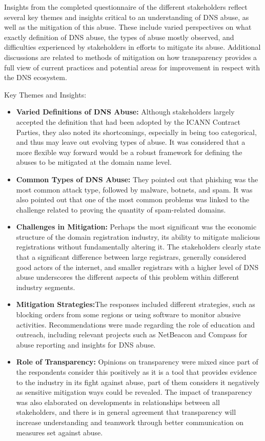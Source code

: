 Insights from the completed questionnaire of the different stakeholders reflect several key themes and insights critical to an understanding of DNS abuse, as well as the mitigation of this abuse. These include varied perspectives on what exactly definition of DNS abuse, the types of abuse mostly observed, and difficulties experienced by stakeholders in efforts to mitigate its abuse. Additional discussions are related to methods of mitigation on how transparency provides a full view of current practices and potential areas for improvement in respect with the DNS ecosystem.

Key Themes and Insights:

\begin{itemize}
  \item \textbf{Varied Definitions of DNS Abuse:} Although stakeholders largely accepted the definition that had been adopted by the ICANN Contract Parties, they also noted its shortcomings, especially in being too categorical, and thus may leave out evolving types of abuse. It was considered that a more flexible way forward would be a robust framework for defining the abuses to be mitigated at the domain name level.
  
  \item \textbf{Common Types of DNS Abuse:} They pointed out that phishing was the most common attack type, followed by malware, botnets, and spam. It was also pointed out that one of the most common problems was linked to the challenge related to proving the quantity of spam-related domains.
  
  \item \textbf{Challenges in Mitigation:} Perhaps the most significant was the economic structure of the domain registration industry, its ability to mitigate malicious registrations without fundamentally altering it. The stakeholders clearly state that a significant difference between large registrars, generally considered good actors of the internet, and smaller registrars with a higher level of DNS abuse underscores the different aspects of this problem within different industry segments.
  
  \item \textbf{Mitigation Strategies:}The responses included different strategies, such as blocking orders from some regions or using software to monitor abusive activities. Recommendations were made regarding the role of education and outreach, including relevant projects such as NetBeacon and Compass for abuse reporting and insights for DNS abuse.
  \item \textbf{Role of Transparency:} Opinions on transparency were mixed since part of the respondents consider this positively as it is a tool that provides evidence to the industry in its fight against abuse, part of them considers it negatively as sensitive mitigation ways could be revealed. The impact of transparency was also elaborated on developments in relationships between all stakeholders, and there is in general agreement that transparency will increase understanding and teamwork through better communication on measures set against abuse.
  
\end{itemize}

